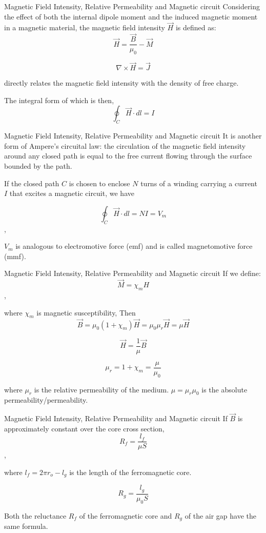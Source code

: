 \documentclass[xcolor={dvipsnames}]{beamer}
\begin{document}
\begin{frame}{Magnetic Field Intensity, Relative Permeability and Magnetic circuit}
Considering the effect of both the internal dipole moment and the induced magnetic moment in a magnetic material, the magnetic field intensity $\vec{H}$ is defined as:
$$
\vec{H} = \frac{\vec{B}}{\mu_0} - \vec{M}
$$

$$
\nabla\times\vec{H} = \vec{J}
$$

directly relates the magnetic field intensity with the density of free charge. 

The integral form of which is then, 
$$
\oint_C\vec{H}\cdot dl = I
$$
\end{frame}
\begin{frame}{Magnetic Field Intensity, Relative Permeability and Magnetic circuit}
It is another form of Ampere's circuital law: the circulation of the magnetic field intensity around any closed path is equal to the free current flowing through the surface bounded by the path.

If the closed path $C$ is chosen to enclose $N$ turns of a winding carrying a current $I$ that excites a magnetic circuit, we have

$$
\oint_C\vec{H}\cdot dl = NI = V_m
$$,

$V_m$ is analogous to electromotive force (emf) and is called magnetomotive force (mmf). 
\end{frame}
\begin{frame}{Magnetic Field Intensity, Relative Permeability and Magnetic circuit}
If we define: 
$$
\vec{M} = \chi_m H
$$,

where $\chi_m$ is magnetic susceptibility, Then
$$
\vec{B} = \mu_0(1+\chi_m)\vec{H} =\mu_0\mu_r\vec{H} =\mu\vec{H}
$$

$$
\vec{H} =\frac{1}{\mu}\vec{B}
$$

$$
\mu_r = 1+\chi_m = \frac{\mu}{\mu_0}
$$

where $\mu_r$ is the relative permeability of the medium. $\mu=\mu_r\mu_0$ is the absolute permeability/permeability. 
\end{frame}
\begin{frame}{Magnetic Field Intensity, Relative Permeability and Magnetic circuit}
If $\vec{B}$ is approximately constant over the core cross section,
$$
R_f = \frac{l_f}{\mu S}
$$,

where $l_f = 2\pi r_o - l_g$ is the length of the ferromagnetic core.

$$
R_g = \frac{l_g}{\mu_0S}
$$

Both the reluctance $R_f$ of the ferromagnetic core and $R_g$ of the air gap have the same formula.


\end{frame}
\end{document}
